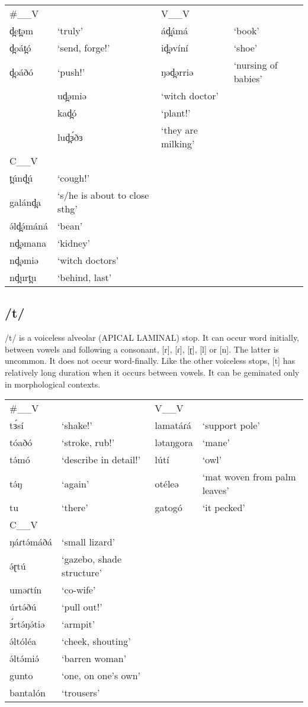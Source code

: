 \ea
\begin{tabular}[t]{llll}
\#\_\_V	&	&	V\_\_V	\\
d̪et̪əm	&‘truly’		&ád̪ámá		&‘book’\\
d̪oát̪ó	&‘send, forge!’	&id̪əvíní	&‘shoe’\\
d̪oáðó	&‘push!’		&ŋəd̪ərriə	&‘nursing of babies’\\
						&ud̪əmiə		&‘witch doctor’\\
						&kad̪ó		&‘plant!’\\
						&lud̪ɜ́ðɜ		&‘they are milking’\\
\midrule
C\_\_V\\
\midrule		
t̪únd̪ú	&‘cough!’		\\
galánd̪a	&‘s/he is about to close sthg’			\\
ə́ld̪ə́máná	&‘bean’		\\
nd̪əmana	&‘kidney’	\\	
nd̪əmiə	&‘witch doctors’		\\
nd̪urt̪u	&‘behind, last’
\end{tabular}\label{ex:ch2:18}
\z	


\subsection{/t/}
/t/ is a voiceless alveolar (APICAL LAMINAL) stop. It can occur word initially, between vowels and following a consonant, [r], [ɾ], [ɽ], [l] or [n]. The latter is uncommon. It does not occur word-finally.
Like the other voiceless stops, [t] has relatively long duration when it occurs between vowels. It can be geminated only in morphological contexts.  

\ea
\begin{tabular}[t]{lllp{3cm}}
\#\_\_V	&&	V\_\_V	\\
tɜ́sí	&‘shake!’				&lamatáɾá	&‘support pole’\\
tóaðó	&‘stroke, rub!’			&lətaŋgora	&‘mane’\\
tə́mó		&‘describe in detail!’	&lútí		&‘owl’\\
tə́ŋ		&‘again’				&otéleə		&‘mat woven from palm leaves’\\

tu		&‘there’				&gatogó		&‘it pecked’\\
\midrule			
C\_\_V		\\
\midrule
ŋáɾtə́máðá	&‘small lizard’		\\
ə́ɽtú			&‘gazebo, shade structure’		\\
uməɾtín		&‘co-wife’		\\
úrtə́ðú		&‘pull out!’		\\
ɜ́rtə́ŋə́tiə		&‘armpit’		\\
ə́ltóléa		&‘cheek, shouting’		\\
ə́ltə́miə́		&‘barren woman’		\\
gunto		&‘one, on one’s own’		\\
bantalón	&‘trousers’		
\end{tabular}\label{ex:ch2:19}
\z 

